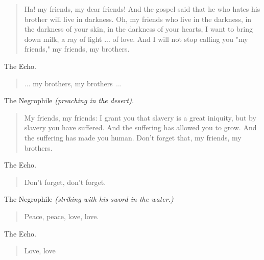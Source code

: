 \documentclass[letterpaper,article,12pt,oneside,notitlepage]{memoir}
\begin{document}
\begin{verse}
Ha! my friends, my dear friends! And the gospel said that he who hates his brother will live in darkness. Oh, my friends who live in the darkness, in the darkness of your skin, in the darkness of your hearts, I want to bring down milk, a ray of light ... of love. And I will not stop calling you "my friends," my friends, my brothers.  \\
\end{verse}

\begin{center}The Echo.\end{center}

\begin{verse}
... my brothers, my brothers ... \\
\end{verse}

\begin{center}The Negrophile \textit{(preaching in the desert).}\end{center}

\begin{verse}
My friends, my friends: I grant you that slavery is a great iniquity, but by slavery you have suffered. And the suffering has allowed you to grow. And the suffering has made you human. Don't forget that, my friends, my brothers.  \\
\end{verse}

\clearpage

\begin{center}The Echo.\end{center}

\begin{verse}
Don't forget, don't forget. \\
\end{verse}

\begin{center}The Negrophile \textit{(striking with his sword in the water.)}\end{center}

\begin{verse}
Peace, peace, love, love. \\
\end{verse}

\begin{center}The Echo.\end{center}

\begin{verse}
Love, love \\
\end{verse}
\end{document}
